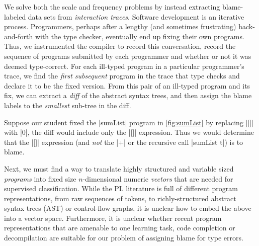 %
We solve both the scale and
frequency problems by instead
extracting blame-labeled data sets
from \emph{interaction traces}.
%
Software development is an iterative process.
Programmers, perhaps after a lengthy (and
sometimes frustrating) back-and-forth with
the type checker, eventually end up fixing
their own programs.
%
Thus, we instrumented
the \ocaml compiler to record
this conversation, \ie record the sequence
of programs submitted by each programmer and
whether or not it was deemed type-correct.
%
For each ill-typed program in
a particular programmer's trace,
we find the \emph{first subsequent}
program in the trace that type checks
and declare it to be the fixed version.
%
From this pair of an ill-typed program
and its fix, we can extract a \emph{diff}
of the abstract syntax trees, and then assign
the blame labels to the \emph{smallest}
sub-tree in the diff.


Suppose our student
fixed the |sumList| program in
\autoref{fig:sumList} by replacing
|[]| with |0|, the diff would
include only the |[]| expression.
%
Thus we would determine that the
|[]| expression (and \emph{not} the
|+| or the recursive call |sumList t|)
is to blame.



Next, we must find a way to translate
highly structured and variable sized
\emph{programs} into fixed size
$n$-dimensional numeric \emph{vectors}
that are needed for supervised
classification.
%
While the PL literature is full
of different program
representations, from raw
sequences of tokens, to
richly-structured
abstract syntax trees (AST) or
control-flow graphs, it is
unclear how to embed the
above into a vector space.
%
Furthermore, it is unclear whether
recent program representations that
are amenable to one learning task,
\eg code completion \citep{Devanbu:2012,Raychev:2014}
or decompilation \citep{Raychev2015-jg,Bielik2016-br}
are suitable for our problem of
assigning blame for type errors.

